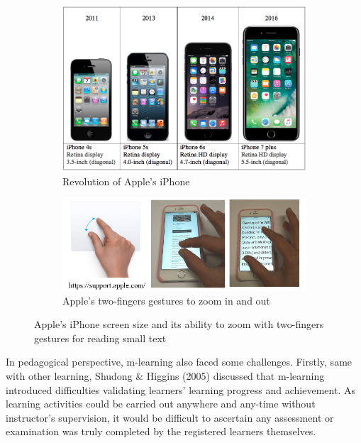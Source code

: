 \begin{figure}[!hbt]\centering
    \begin{subfigure}{0.8\textwidth}
\includegraphics[width=\textwidth]{cha3}
\caption{Revolution of Apple's iPhone}
    \end{subfigure}\hspace{0.1\textwidth}
 \begin{subfigure}{0.8\textwidth}
\includegraphics[width=\textwidth]{cha6}
\caption{Apple's two-fingers gestures to zoom in and out}
 \end{subfigure}
  \caption{Apple's iPhone screen size and its ability to zoom with two-fingers gestures for reading small text}
\end{figure}

In pedagogical perspective, m-learning also faced some challenges. Firstly, same with other learning, Shudong \& Higgins (2005) \cite{shudong2005limitations} discussed that m-learning introduced difficulties validating learners' learning progress and achievement. As learning activities could be carried out anywhere and any-time without instructor's supervision, it would be difficult to ascertain any assessment or examination was truly completed by the registered learners themselves.

